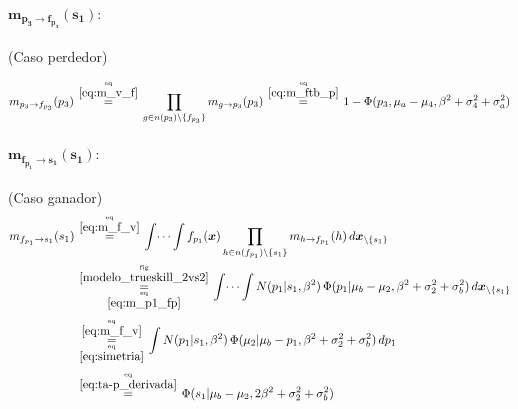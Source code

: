 \documentclass[article]{jss}
\newcommand\hfrac[2]{\genfrac{}{}{0pt}{}{#1}{#2}} %
\begin{document}
\begin{appendix}
\paragraph{$\bm{m_{p_3 \rightarrow f_{p_3}}(s_1)}:$} (Caso perdedor)

\begin{equation}\label{eq:m_p3_fp}
\begin{split}
 m_{p_3 \rightarrow f_{p_3}}(p_3) \overset{\hfrac{\text{eq}}{\ref{eq:m_v_f}}}{=} \prod_{g \in n(p_3) \setminus  \{f_{p_3} \}} m_{g \rightarrow p_3} (p_3)  \overset{\hfrac{\text{eq}}{\ref{eq:m_ftb_p}}}{=}  1 - \Phi(p_3, \mu_a  - \mu_4, \beta^2 + \sigma_4^2 + \sigma_a^2) 
\end{split}
\end{equation}

\paragraph{$\bm{m_{f_{p_1} \rightarrow s_1}(s_1)}:$} (Caso ganador)
\begin{equation}\label{eq:m_fp_s1}
\begin{split}
m_{f_{p_1} \rightarrow s_1}(s_1) & \overset{\hfrac{\text{eq}}{\ref{eq:m_f_v}}}{=} \int \dots \int f_{p_1}(\bm{x}) \prod_{h \in n(f_{p_1}) \setminus \{s_1\} } m_{h \rightarrow f_{p_1}}(h) \, d\bm{x}_{\setminus \{s_1\} }  \\
&\overset{\hfrac{\text{fig}}{\ref{modelo_trueskill_2vs2}}}{\underset{\hfrac{\text{eq}}{\ref{eq:m_p1_fp}}}{=}} \int \dots \int N(p_1| s_1, \beta^2) \, \Phi(p_1| \mu_b - \mu_2, \beta^2 + \sigma_2^2 + \sigma_b^2 ) \, d\bm{x}_{\setminus \{s_1\} }
\\[0.1cm]
& \overset{\hfrac{\text{eq}}{\ref{eq:m_f_v}}}{\underset{\hfrac{\text{eq}}{\ref{eq:simetria}}}{=}} \int N(p_1| s_1, \beta^2) \, \Phi(\mu_2| \mu_b -  p_1, \beta^2 + \sigma_2^2 + \sigma_b^2) \, dp_1 \\[0.1cm]
&\overset{\hfrac{\text{eq}}{\ref{eq:ta-p_derivada}}}{=} \Phi(s_1| \mu_b - \mu_2, 2\beta^2 + \sigma_2^2 + \sigma_b^2)  
\end{split}
\end{equation}


\end{appendix}
\end{document}

